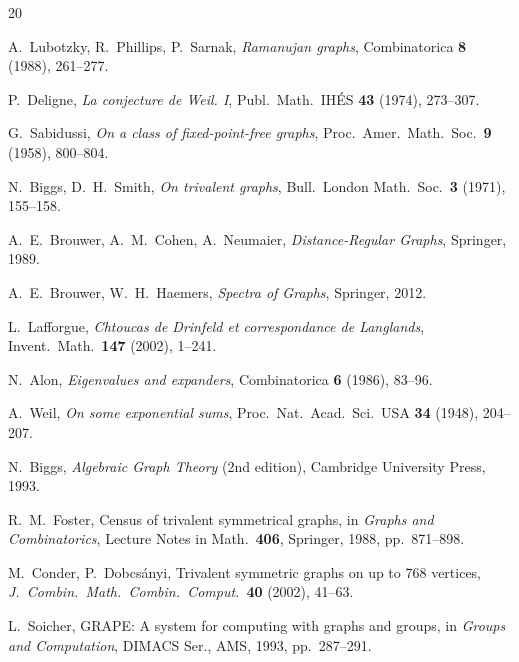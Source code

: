 \documentclass[11pt,a4paper]{article}
\theoremstyle{plain}
\theoremstyle{definition}
\theoremstyle{remark}
\begin{document}
\begin{thebibliography}{20}

A.~Lubotzky, R.~Phillips, P.~Sarnak,
\emph{Ramanujan graphs},
Combinatorica \textbf{8} (1988), 261--277.

P.~Deligne,
\emph{La conjecture de Weil. I},
Publ.\ Math.\ IH\'ES \textbf{43} (1974), 273--307.

G.~Sabidussi,
\emph{On a class of fixed-point-free graphs},
Proc.\ Amer.\ Math.\ Soc.\ \textbf{9} (1958), 800--804.

N.~Biggs, D.~H.~Smith,
\emph{On trivalent graphs},
Bull.\ London Math.\ Soc.\ \textbf{3} (1971), 155--158.

A.~E.~Brouwer, A.~M.~Cohen, A.~Neumaier,
\emph{Distance-Regular Graphs},
Springer, 1989.

A.~E.~Brouwer, W.~H.~Haemers,
\emph{Spectra of Graphs},
Springer, 2012.

L.~Lafforgue,
\emph{Chtoucas de Drinfeld et correspondance de Langlands},
Invent.\ Math.\ \textbf{147} (2002), 1--241.

N.~Alon,
\emph{Eigenvalues and expanders},
Combinatorica \textbf{6} (1986), 83--96.

A.~Weil,
\emph{On some exponential sums},
Proc.\ Nat.\ Acad.\ Sci.\ USA \textbf{34} (1948), 204--207.

N.~Biggs,
\emph{Algebraic Graph Theory} (2nd edition),
Cambridge University Press, 1993.

R.~M.~Foster,
Census of trivalent symmetrical graphs,
in \emph{Graphs and Combinatorics}, Lecture Notes in Math.\ \textbf{406},
Springer, 1988, pp.~871--898.

M.~Conder, P.~Dobcs\'{a}nyi,
Trivalent symmetric graphs on up to 768 vertices,
\emph{J.\ Combin.\ Math.\ Combin.\ Comput.}\ \textbf{40} (2002), 41--63.

L.~Soicher,
GRAPE: A system for computing with graphs and groups,
in \emph{Groups and Computation}, DIMACS Ser., AMS, 1993, pp.~287--291.

\end{thebibliography}
\end{document}
